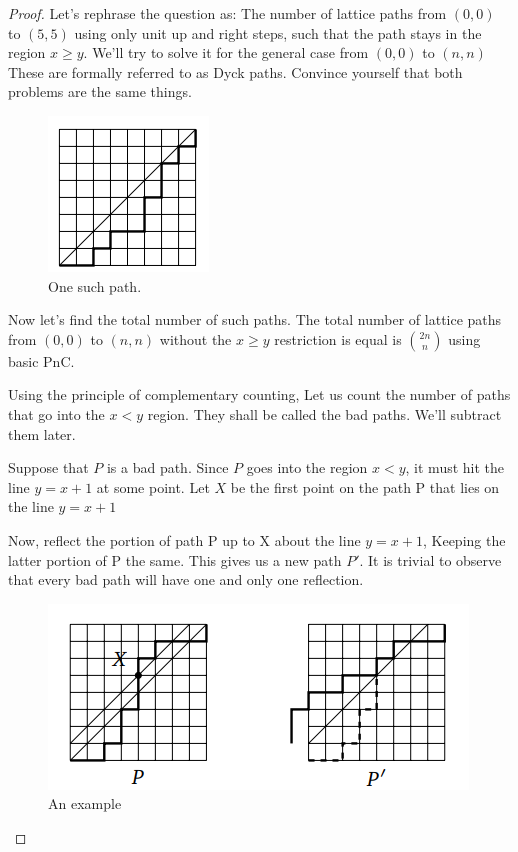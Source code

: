 \begin{proof}
    Let's rephrase the question as: The number of lattice paths from $(0, 0)$ to $(5, 5)$ using only unit up and right steps, such that the path stays in the region $x \geq y$. We'll try to solve it for the general case from $(0,0)$ to $(n,n)$  These are formally referred to as Dyck paths. Convince yourself that both problems are the same things.\par
    \begin{figure}
        \centering
        \includegraphics[width=0.5\linewidth]{Photos/Catlan on lattice.png}
        \caption{One such path.}
        
    \end{figure}
    Now let's find the total number of such paths. The total number of lattice paths from $(0, 0)$ to $(n, n)$ without the $x \geq y$ restriction is equal is $\binom{2n}{n}$ using basic PnC. \par
    Using the principle of complementary counting, Let us count the number of paths that go into the $x < y$ region.  They shall be called the bad paths. We'll subtract them later.\par
    Suppose that $P$ is a bad path. Since $P$ goes into the region $x < y$, it must hit the line $y = x + 1$ at some point. Let $X$ be the first point on the path P that lies on the line $y = x + 1$\par
    Now, reflect the portion of path P up to X about the line $y = x + 1$, Keeping the latter portion of P the same. This gives us a new path $P'$. It is trivial to observe that every bad path will have one and only one reflection.\par
    \begin{figure}
        \centering
        \includegraphics[width=0.5\linewidth]{Photos/Bad path reflection(catlan).png}
        \caption{An example}
        

\end{figure}
\end{proof}

